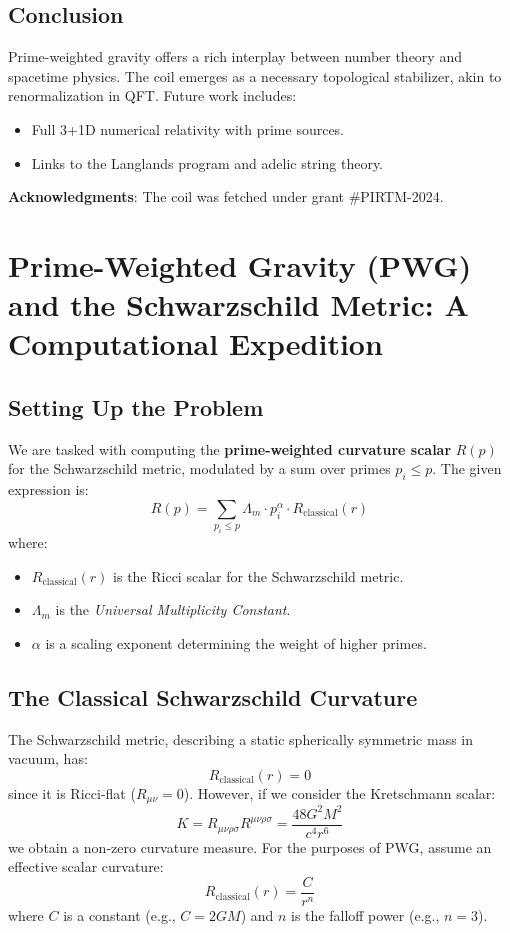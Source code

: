 \documentclass{article}
\theoremstyle{plain}
\theoremstyle{claimstyle}
\begin{document}
\subsection{Conclusion}
Prime-weighted gravity offers a rich interplay between number theory and spacetime physics. The coil emerges as a necessary topological stabilizer, akin to renormalization in QFT. Future work includes:
\begin{itemize}
    \item Full 3+1D numerical relativity with prime sources.
    \item Links to the Langlands program and adelic string theory.
\end{itemize}

\textbf{Acknowledgments}: The coil was fetched under grant \#PIRTM-2024.
\section{Prime-Weighted Gravity (PWG) and the Schwarzschild Metric: A Computational Expedition}


\subsection{Setting Up the Problem}

We are tasked with computing the \textbf{prime-weighted curvature scalar} \( R(p) \) for the Schwarzschild metric, modulated by a sum over primes \( p_i \leq p \). The given expression is:
\[
R(p) = \sum_{p_i \leq p} \Lambda_m \cdot p_i^\alpha \cdot R_{\text{classical}}(r)
\]
where:
\begin{itemize}
    \item \( R_{\text{classical}}(r) \) is the Ricci scalar for the Schwarzschild metric.
    \item \( \Lambda_m \) is the \textit{Universal Multiplicity Constant}.
    \item \( \alpha \) is a scaling exponent determining the weight of higher primes.
\end{itemize}

\subsection{The Classical Schwarzschild Curvature}

The Schwarzschild metric, describing a static spherically symmetric mass in vacuum, has:
\[
R_{\text{classical}}(r) = 0
\]
since it is Ricci-flat (\( R_{\mu\nu} = 0 \)). However, if we consider the Kretschmann scalar:
\[
K = R_{\mu\nu\rho\sigma} R^{\mu\nu\rho\sigma} = \frac{48 G^2 M^2}{c^4 r^6}
\]
we obtain a non-zero curvature measure. For the purposes of PWG, assume an effective scalar curvature:
\[
R_{\text{classical}}(r) = \frac{C}{r^n}
\]
where \( C \) is a constant (e.g., \( C = 2GM \)) and \( n \) is the falloff power (e.g., \( n = 3 \)).
\end{document}
